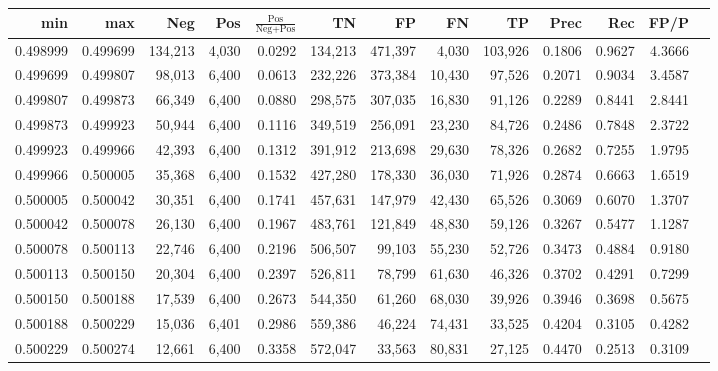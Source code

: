 \begin{tabular}{rrrrrrrrrrrrr}
\toprule
     min &      max &     Neg &   Pos & $\frac{\text{Pos}}{\text{Neg}+\text{Pos}}$ &      TN &      FP &      FN &      TP &   Prec &    Rec &   FP/P \\
\midrule
0.498999 & 0.499699 & 134,213 & 4,030 &                                     0.0292 & 134,213 & 471,397 &   4,030 & 103,926 & 0.1806 & 0.9627 & 4.3666 \\
0.499699 & 0.499807 &  98,013 & 6,400 &                                     0.0613 & 232,226 & 373,384 &  10,430 &  97,526 & 0.2071 & 0.9034 & 3.4587 \\
0.499807 & 0.499873 &  66,349 & 6,400 &                                     0.0880 & 298,575 & 307,035 &  16,830 &  91,126 & 0.2289 & 0.8441 & 2.8441 \\
0.499873 & 0.499923 &  50,944 & 6,400 &                                     0.1116 & 349,519 & 256,091 &  23,230 &  84,726 & 0.2486 & 0.7848 & 2.3722 \\
0.499923 & 0.499966 &  42,393 & 6,400 &                                     0.1312 & 391,912 & 213,698 &  29,630 &  78,326 & 0.2682 & 0.7255 & 1.9795 \\
0.499966 & 0.500005 &  35,368 & 6,400 &                                     0.1532 & 427,280 & 178,330 &  36,030 &  71,926 & 0.2874 & 0.6663 & 1.6519 \\
0.500005 & 0.500042 &  30,351 & 6,400 &                                     0.1741 & 457,631 & 147,979 &  42,430 &  65,526 & 0.3069 & 0.6070 & 1.3707 \\
0.500042 & 0.500078 &  26,130 & 6,400 &                                     0.1967 & 483,761 & 121,849 &  48,830 &  59,126 & 0.3267 & 0.5477 & 1.1287 \\
0.500078 & 0.500113 &  22,746 & 6,400 &                                     0.2196 & 506,507 &  99,103 &  55,230 &  52,726 & 0.3473 & 0.4884 & 0.9180 \\
0.500113 & 0.500150 &  20,304 & 6,400 &                                     0.2397 & 526,811 &  78,799 &  61,630 &  46,326 & 0.3702 & 0.4291 & 0.7299 \\
0.500150 & 0.500188 &  17,539 & 6,400 &                                     0.2673 & 544,350 &  61,260 &  68,030 &  39,926 & 0.3946 & 0.3698 & 0.5675 \\
0.500188 & 0.500229 &  15,036 & 6,401 &                                     0.2986 & 559,386 &  46,224 &  74,431 &  33,525 & 0.4204 & 0.3105 & 0.4282 \\
0.500229 & 0.500274 &  12,661 & 6,400 &                                     0.3358 & 572,047 &  33,563 &  80,831 &  27,125 & 0.4470 & 0.2513 & 0.3109 \\

\end{tabular}
